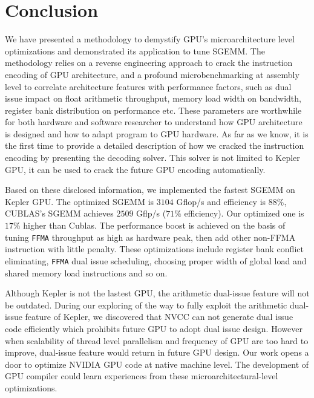 \section{Conclusion}
\label{sec:conclusion}
We have presented a methodology to demystify GPU's microarchitecture level optimizations and demonstrated its 
application to tune SGEMM. The methodology relies on a reverse engineering approach to crack the instruction encoding 
of GPU architecture, and a profound microbenchmarking at assembly level to correlate architecture features with 
performance factors, such as dual issue impact on float arithmetic throughput, memory load width on bandwidth, register 
bank distribution on performance etc. These parameters are worthwhile for both hardware and software researcher to 
understand how GPU architecture is designed and how to adapt program to GPU hardware. As far as we know, it is the 
first time to provide a detailed description of how we cracked the instruction encoding by presenting the decoding 
solver. This solver is not limited to Kepler GPU, it can be used to crack the future GPU encoding automatically.

Based on these disclosed information, we implemented the fastest SGEMM on Kepler GPU. The optimized SGEMM is $3104$ 
Gflop/s and efficiency is $88\%$, CUBLAS's SGEMM achieves $2509$ Gflp/s ($71\%$ efficiency). Our optimized one is 
$17\%$ higher than Cublas. The performance boost is achieved on the basis of tuning {\tt FFMA} throughput as high as 
hardware peak, then add other non-FFMA instruction with little penalty. These optimizations include register bank 
conflict eliminating, {\tt FFMA} dual issue scheduling, choosing proper width of global load and shared memory load 
instructions and so on.

Although Kepler is not the lastest GPU, the arithmetic dual-issue feature will not be outdated.
During our exploring of the way to fully exploit the arithmetic dual-issue feature of Kepler, we discovered that NVCC
can not generate dual issue code efficiently which prohibits future GPU to adopt dual issue design. 
However when scalability of thread level parallelism
and frequency of GPU are too hard to improve, dual-issue feature would return in future GPU design.
Our work opens a door to optimize NVIDIA GPU code at native machine level. The development of 
GPU compiler could learn experiences from these microarchitectural-level optimizations.
